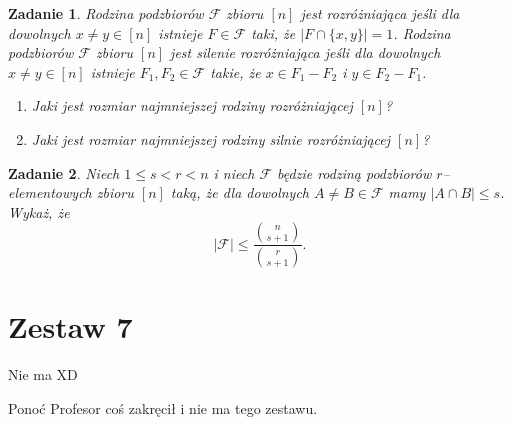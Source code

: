 \documentclass{mwart}
\newtheorem{zad}{Zadanie}[section]
\begin{document}
\begin{zad}
    Rodzina podzbiorów $\mathcal{F}$ zbioru $[n]$ jest rozróżniająca jeśli dla dowolnych
    $x \neq y \in [n]$ istnieje $F \in \mathcal{F }$ taki, że $|F \cap \{x,y\}| = 1$.
    Rodzina podzbiorów $\mathcal{F }$ zbioru $[n]$ jest silenie rozróżniająca jeśli dla
    dowolnych $ x \neq y \in [n]$ istnieje $F_1,F_2 \in \mathcal{F }$ takie, że $x \in F_1-F_2$ i $y \in F_2 - F_1$.
    \begin{enumerate}
        \item Jaki jest rozmiar najmniejszej rodziny rozróżniającej $[n]$?
        \item Jaki jest rozmiar najmniejszej rodziny silnie rozróżniającej $[n]$?
    \end{enumerate}
\end{zad}
\begin{mdframed}

\end{mdframed}
\begin{mdframed}

\end{mdframed}


\begin{zad}
    Niech $1 \leq s < r < n$ i niech $\mathcal{F }$ będzie rodziną podzbiorów $r$--elementowych
    zbioru $[n]$ taką, że dla dowolnych $A \neq B \in \mathcal{F }$ mamy $ |A \cap B| \leq s$.
    Wykaż, że \[|\mathcal{F }| \leq \frac{\binom{n}{s+1}}{\binom{r}{s+1}}.\]
\end{zad}
\begin{mdframed}

\end{mdframed}
\begin{mdframed}

\end{mdframed}













\newpage
\section{Zestaw 7}          %
Nie ma XD

Ponoć Profesor coś zakręcił i nie ma tego zestawu.
\end{document}
